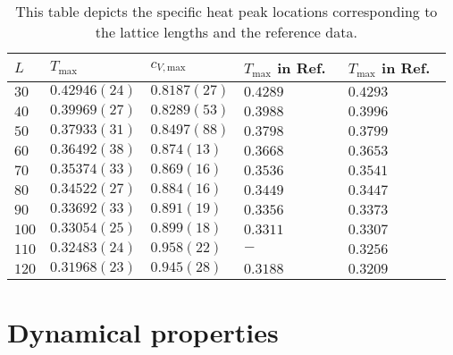 \begin{table}[h]
  \centering
    \begin{tabular}{|lllll|}
      \hline
      $L$ & $T_\mathrm{max}$ & $c_{V,\mathrm{max}}$ & $T_\mathrm{max}$ in Ref.~\cite{Kalz2008} & $T_\mathrm{max}$ in Ref.~\cite{Lee2024} \\
      \hline
      $30$  & $0.42946(24)$ & $0.8187(27)$  & $0.4289$  & $0.4293$ \\ 
      $40$  & $0.39969(27)$ & $0.8289(53)$  & $0.3988$  & $0.3996$ \\ 
      $50$  & $0.37933(31)$ & $0.8497(88)$  & $0.3798$  & $0.3799$ \\ 
      $60$  & $0.36492(38)$ & $0.874(13)$   & $0.3668$  & $0.3653$ \\ 
      $70$  & $0.35374(33)$ & $0.869(16)$   & $0.3536$  & $0.3541$ \\ 
      $80$  & $0.34522(27)$ & $0.884(16)$   & $0.3449$  & $0.3447$ \\ 
      $90$  & $0.33692(33)$ & $0.891(19)$   & $0.3356$  & $0.3373$ \\ 
      $100$ & $0.33054(25)$ & $0.899(18)$   & $0.3311$  & $0.3307$ \\ 
      $110$ & $0.32483(24)$ & $0.958(22)$   & $-$       & $0.3256$ \\ 
      $120$ & $0.31968(23)$ & $0.945(28)$   & $0.3188$  & $0.3209$ \\ 
      \hline
    \end{tabular}
  \caption{This table depicts the specific heat peak locations corresponding to the lattice lengths and the reference data.}
  \label{table:heat}
\end{table}



\section{Dynamical properties}
\label{sec:timmons_experiment}

